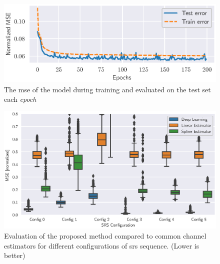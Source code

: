 \begin{figure}
    \centering
    \includegraphics{chapters/part_uplink/figures/results/channel_estimation/Training_test_error.eps}
    \caption{The \gls{mse} of the model during training and evaluated on the test set each \emph{epoch}}
    \label{fig:training_test_error_channel_estimator}
\end{figure}

\begin{figure}
    \centering
    \includegraphics{chapters/part_uplink/figures/results/channel_estimation/srs_configuration_error_boxplot.eps}
    \caption{Evaluation of the proposed method compared to common channel estimators for different configurations of \gls{srs} sequence. (Lower is better)}
    \label{fig:srs_configuration_error_boxplot}
\end{figure}

